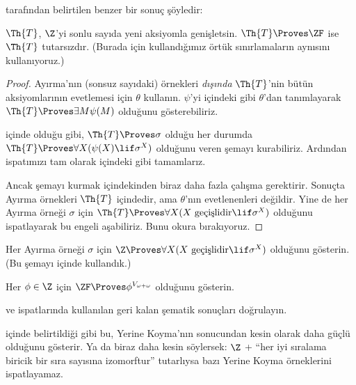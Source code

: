 \citet[223]{Potter2004} tarafından belirtilen benzer bir sonuç şöyledir:

\begin{prop}
	$\Th{T}$, $\Z$'yi sonlu sayıda yeni aksiyomla genişletsin.
	$\Th{T} \Proves \ZF$ ise $\Th{T}$ tutarsızdır. (Burada
	 için kullandığımız örtük sınırlamaların aynısını
	kullanıyoruz.)
\end{prop}
\begin{proof}
	Ayırma'nın (sonsuz sayıdaki) örnekleri \emph{dışında} $\Th{T}$'nin bütün
	aksiyomlarının evetlemesi için $\theta$ kullanın. $\psi$'yi
	 içindeki gibi $\theta$'dan tanımlayarak
	$\Th{T} \Proves \exists M \psi(M)$ olduğunu gösterebiliriz.
	
	 içinde olduğu gibi, $\Th{T} \Proves \sigma$ olduğu
	her durumda $\Th{T} \Proves \forall X(\psi(X) \lif \sigma^X)$ olduğunu
	veren şemayı kurabiliriz. Ardından ispatımızı tam olarak
	 içindeki gibi tamamlarız.
	
	Ancak şemayı kurmak  içindekinden biraz daha fazla
	çalışma gerektirir. Sonuçta Ayırma örnekleri $\Th{T}$ içindedir, ama
	$\theta$'nın evetlenenleri değildir. Yine de her Ayırma örneği
	$\sigma$ için $\Th{T} \Proves \forall X(X\text{ geçişlidir} \lif
	\sigma^X)$ olduğunu ispatlayarak bu engeli aşabiliriz. Bunu okura
	bırakıyoruz.
\end{proof}
\begin{prob}
	Her Ayırma örneği $\sigma$ için $\Z \Proves \forall X(X\text{ geçişlidir}
	\lif \sigma^X)$ olduğunu gösterin. (Bu şemayı
	içinde kullandık.)
\end{prob}
\begin{prob}
	Her $\phi \in \Z$ için $\ZF \Proves \phi^{V_{\omega+\omega}}$ olduğunu
	gösterin.
\end{prob}
\begin{prob}
	 ve
	ispatlarında kullanılan geri kalan şematik sonuçları doğrulayın.
\end{prob}

 içinde belirtildiği gibi bu, Yerine
Koyma'nın  sonucundan
kesin olarak daha güçlü olduğunu gösterir. Ya da biraz daha kesin söylersek:
$\Z$ + ``her iyi sıralama biricik bir sıra sayısına izomorftur'' tutarlıysa
bazı Yerine Koyma örneklerini ispatlayamaz.



